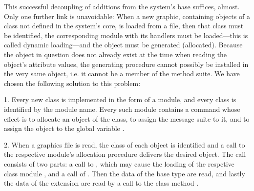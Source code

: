 This successful decoupling of additions from the system's base suffices, almost. Only one further link is unavoidable: When a new graphic, containing objects of a class not defined in the system's core, is loaded from a file, then that class must be identified, the corresponding module with its handlers must be loaded---this is called dynamic loading---and the object must be generated (allocated). Because the object in question does not already exist at the time when reading the object's attribute values, the generating procedure cannot possibly be installed in the very same object, i.e. it cannot be a member of the method suite. We have chosen the following solution to this problem:

\item{1.} Every new class is implemented in the form of a module, and every class is identified by the module name. Every such module contains a command whose effect is to allocate an object of the class, to assign the message suite to it, and to assign the object to the global variable .
\item{2.} When a graphics file is read, the class of each object is identified and a call to the respective module's allocation procedure delivers the desired object. The call consists of two parts: a call to , which may cause the loading of the respctive class module , and a call of . Then the data of the base type  are read, and lastly the data of the extension are read by a call to the class method .

